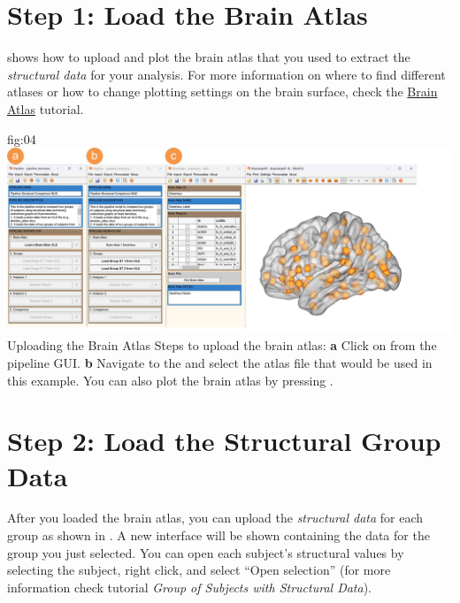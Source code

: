 \documentclass[justified]{tufte-handout}
\begin{document}

\clearpage

\section{Step 1: Load the Brain Atlas}

 shows how to upload and plot the brain atlas that you used to extract the \emph{structural data} for your analysis. For more information on where to find different atlases or how to change plotting settings on the brain surface, check the \href{https://github.com/braph-software/BRAPH-2/tree/develop/tutorials/data/tut_gr_st}{Brain Atlas} tutorial.

	{fig:04}
	{\includegraphics{fig04.jpg}}
	{Uploading the Brain Atlas}
	{
	Steps to upload the brain atlas:
	{\bf a} Click on  from the pipeline GUI.
	{\bf b} Navigate to the  and select the atlas file  that would be used in this example. You can also plot the brain atlas by pressing . 
	}

 
\section{Step 2: Load the Structural Group Data}

After you loaded the brain atlas, you can upload the \emph{structural data} for each group as shown in . A new interface will be shown containing the data for the group you just selected. You can open each subject’s structural values by selecting
the subject, right click, and select “Open selection” (for more information check tutorial \emph{Group of Subjects with Structural Data}).
	
\end{document}
